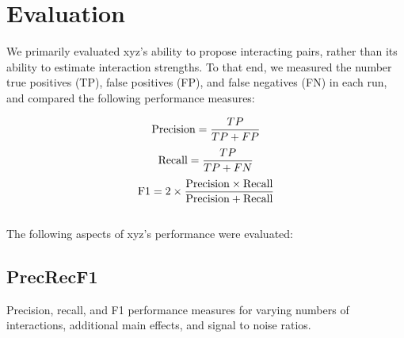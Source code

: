 \section{Evaluation}

We primarily evaluated xyz's ability to propose interacting pairs, rather than its ability to estimate interaction strengths. To that end, we measured the number true positives (TP), false positives (FP), and false negatives (FN) in each run, and compared the following performance measures:

$$\textnormal{Precision} = \frac{TP}{TP + FP}$$
$$\textnormal{Recall} = \frac{TP}{TP + FN}$$
$$\textnormal{F1} = 2 \times \frac{\textnormal{Precision} \times \textnormal{Recall}}{\textnormal{Precision} + \textnormal{Recall}}$$
~\\
The following aspects of xyz's performance were evaluated:

\subsection{PrecRecF1}
Precision, recall, and F1 performance measures for varying numbers of interactions, additional main effects, and signal to noise ratios.

